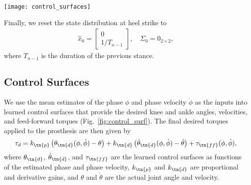 \begin{figure*}[t]
    \centering
    \texttt{[image: control\_surfaces]}
    \caption[Examples of learned control surfaces]{Examples of learned control
    surfaces. We fit the surfaces to gait data from \citet{moore2015elaborate}.
    This data includes information for three speeds, , which are shown as the clustered trajectories in the above
    panels.  For an automatic transition to standing, the surfaces are
    additionally fit to virtual data that causes the joint angles to approach
    \unit[5]{deg}, the velocities to approach , and the
    joint torques to approach \unit[0]{N-m} as the phase velocity goes to
    zero.}\label{fig:control_surf}
\end{figure*}

Finally, we reset the state distribution at heel strike to
\begin{align}
    \hat{x}_0 = \begin{bmatrix} 0 \\ 1/T_{n-1} \end{bmatrix}, \quad \Sigma_0 
        =  0_{2 \times 2}, \label{eq:init_cond_ekf}
\end{align}
where $T_{n-1}$ is the duration of the previous stance.

\subsection{Control Surfaces}\label{sec:ctrl_surfs}

We use the mean estimates of the phase $\phi$ and phase velocity $\dot{\phi}$ as
the inputs into learned control surfaces that provide the desired knee and ankle
angles, velocities, and feed-forward torques (Fig.~\ref{fig:control_surf}). The
final desired torques applied to the prosthesis are then given by 
\begin{align}
    \tau_d = k_\tn{p} \left(\theta_\tn{d}(\phi, \dot{\phi}) - \theta \right) 
        + k_\tn{d} \left(\dot{\theta}_\tn{d}(\phi, \dot{\phi}) 
            - \dot{\theta} \right)
        + \tau_\tn{ff}(\phi, \dot{\phi}), \label{eq:pdandff}
\end{align}
where $\theta_\tn{d}$, $\dot{\theta}_\tn{d}$, and $\tau_\tn{ff}$ are the
learned control surfaces as functions of the estimated phase and phase velocity,
$k_\tn{p}$ and $k_\tn{d}$ are proportional and derivative gains,
and $\theta$ and $\dot{\theta}$ are the actual joint angle and velocity.

